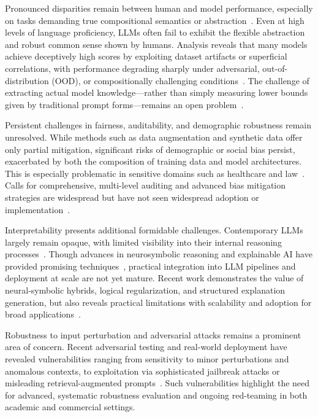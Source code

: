 \documentclass[sigconf]{acmart}
\begin{document}
Pronounced disparities remain between human and model performance, especially on tasks demanding true compositional semantics or abstraction~\cite{ref31,ref32,ref44,ref96,ref98,ref99,ref97,ref92}. Even at high levels of language proficiency, LLMs often fail to exhibit the flexible abstraction and robust common sense shown by humans. Analysis reveals that many models achieve deceptively high scores by exploiting dataset artifacts or superficial correlations, with performance degrading sharply under adversarial, out-of-distribution (OOD), or compositionally challenging conditions~\cite{ref55,ref77,ref98}. The challenge of extracting actual model knowledge---rather than simply measuring lower bounds given by traditional prompt forms---remains an open problem~\cite{ref98}.

Persistent challenges in fairness, auditability, and demographic robustness remain unresolved. While methods such as data augmentation and synthetic data offer only partial mitigation, significant risks of demographic or social bias persist, exacerbated by both the composition of training data and model architectures. This is especially problematic in sensitive domains such as healthcare and law~\cite{ref2,ref15,ref18,ref19,ref49,ref50,ref55,ref90,ref91}. Calls for comprehensive, multi-level auditing and advanced bias mitigation strategies are widespread but have not seen widespread adoption or implementation~\cite{ref15,ref18,ref49,ref89,ref90}. 

Interpretability presents additional formidable challenges. Contemporary LLMs largely remain opaque, with limited visibility into their internal reasoning processes~\cite{ref24,ref34,ref37,ref38,ref41,ref43,ref48,ref54,ref89,ref92,ref93,ref94}. Though advances in neurosymbolic reasoning and explainable AI have provided promising techniques~\cite{ref43,ref49,ref92,ref93,ref89,ref54}, practical integration into LLM pipelines and deployment at scale are not yet mature. Recent work demonstrates the value of neural-symbolic hybrids, logical regularization, and structured explanation generation, but also reveals practical limitations with scalability and adoption for broad applications~\cite{ref48,ref54,ref89,ref93}.

Robustness to input perturbation and adversarial attacks remains a prominent area of concern. Recent adversarial testing and real-world deployment have revealed vulnerabilities ranging from sensitivity to minor perturbations and anomalous contexts, to exploitation via sophisticated jailbreak attacks or misleading retrieval-augmented prompts~\cite{ref13,ref39,ref55,ref56,ref60,ref77,ref78,ref82,ref91}. Such vulnerabilities highlight the need for advanced, systematic robustness evaluation and ongoing red-teaming in both academic and commercial settings.
\end{document}
